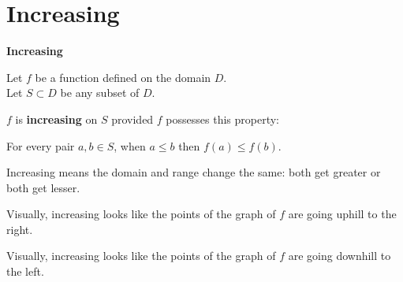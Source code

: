 \documentclass{ximera}
\begin{document}
\section{Increasing}



\begin{definition} \textbf{\textcolor{green!50!black}{Increasing}} 


Let $f$ be a function defined on the domain $D$. \\
Let $S \subset D$ be any subset of $D$.

$f$ is \textbf{increasing} on $S$ provided $f$ possesses this property:  


\begin{center}
For every pair $a, b \in S$, when $a \leq b$ then $f(a) \leq f(b)$.
\end{center}

\end{definition}




\begin{idea}
Increasing means the domain and range change the same: both get greater or both get lesser.
\end{idea}



\begin{observation}
Visually, increasing looks like the points of the graph of $f$ are going uphill to the right.
\end{observation}


\begin{observation}
Visually, increasing looks like the points of the graph of $f$ are going downhill to the left.
\end{observation}
\end{document}
